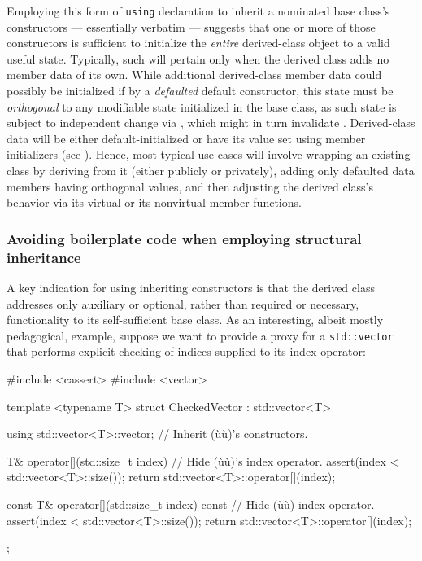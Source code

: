 Employing this form of \lstinline!using! declaration to inherit a nominated
base class's constructors --- essentially verbatim --- suggests that one
or more of those constructors is sufficient to initialize the
\emph{entire} derived-class object to a valid useful state. Typically,
such will pertain only when the derived class adds no member data of its
own. While additional derived-class member data could possibly
be initialized if by a \emph{defaulted} default constructor, this state must be \emph{orthogonal} to
any modifiable state initialized in the base class, as such state is
subject to independent change via , which might in turn
invalidate . Derived-class data will be either default-initialized or have its value set using member
initializers (see ).
Hence, most typical use cases will involve wrapping an
existing class by deriving from it (either publicly or privately),
adding only defaulted data members having orthogonal values, and then
adjusting the derived class's behavior via  its virtual
or  its nonvirtual member functions.

\subsubsection[Avoiding boilerplate code when employing structural inheritance]{Avoiding boilerplate code when employing structural inheritance}\label{avoiding-boilerplate-code-code-when-employing-structural-inheritance}

A key indication for using inheriting constructors is that the
derived class addresses only auxiliary or optional, rather than required
or necessary, functionality to its self-sufficient base class. As an
interesting, albeit mostly pedagogical, example, suppose we
want to provide a proxy for a \lstinline!std::vector! that performs
explicit checking of indices supplied to its index operator:

\begin{emcppslisting}
#include <cassert>
#include <vector>

template <typename T>
struct CheckedVector : std::vector<T>
{
    using std::vector<T>::vector;      // Inherit (ù{}ù)'s constructors.

    T& operator[](std::size_t index)   // Hide (ù{}ù)'s index operator.
    {
         assert(index < std::vector<T>::size());
         return std::vector<T>::operator[](index);
    }

    const T& operator[](std::size_t index) const  // Hide (ù{}ù) index operator.
    {
         assert(index < std::vector<T>::size());
         return std::vector<T>::operator[](index);
    }
};
\end{emcppslisting}

